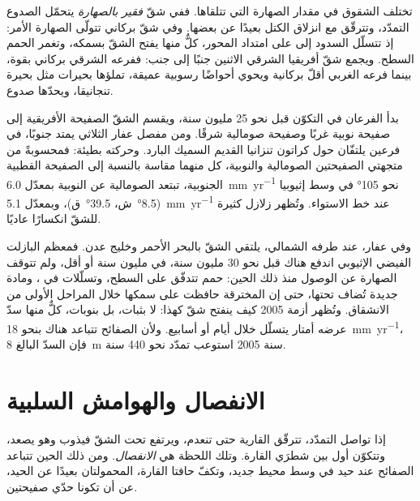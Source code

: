 تختلف الشقوق في مقدار الصهارة التي تتلقاها. ففي شقّ \emph{فقير بالصهارة} يتحمّل الصدوع التمدّد، وتترقّق  مع انزلاق الكتل بعيدًا عن بعضها. وفي شقّ بركاني تتولّى الصهارة الأمر: إذ تتسلّل السدود إلى  على امتداد المحور، كلٌّ منها يفتح الشقّ بسمكه، وتغمر الحمم السطح. ويجمع شقّ أفريقيا الشرقي الاثنين جنبًا إلى جنب: ففرعه الشرقي بركاني بقوة، بينما فرعه الغربي أقلّ بركانية ويحوي أحواضًا رسوبية عميقة، تملؤها بحيرات مثل بحيرة تنجانيقا، ويحدّها صدوع.

بدأ الفرعان في التكوّن قبل نحو 25 مليون سنة، ويقسم الشقّ الصفيحة الأفريقية إلى صفيحة نوبية غربًا وصفيحة صومالية شرقًا. ومن مفصل عفار الثلاثي يمتد جنوبًا، في فرعين يلتفّان حول كراتون تنزانيا القديم السميك البارد. وحركته بطيئة: فمحسوبةً من متجهتي الصفيحتين الصومالية والنوبية، كل منهما مقاسة بالنسبة إلى الصفيحة القطبية الجنوبية، تبتعد الصومالية عن النوبية بمعدّل \qty{6.0}{mm.yr^{-1}} نحو \ang{105} في وسط إثيوبيا (\ang{8.5}~ش، \ang{39.5}~ق)، وبمعدّل \qty{5.1}{mm.yr^{-1}} عند خط الاستواء. وتُظهر زلازل كثيرة للشقّ انكسارًا عاديًا.

وفي عفار، عند طرفه الشمالي، يلتقي الشقّ بالبحر الأحمر وخليج عدن. فمعظم البازلت الفيضي الإثيوبي اندفع هناك قبل نحو 30 مليون سنة، في مليون سنة أو أقل، ولم تتوقف الصهارة عن الوصول منذ ذلك الحين: حمم تتدفّق على السطح، وتسلّلات في ، ومادة جديدة تُضاف تحتها، حتى إن  المخترقة حافظت على سمكها خلال المراحل الأولى من الانشقاق. وتُظهر أزمة 2005 كيف ينفتح شقّ كهذا: لا بثبات، بل بنوبات، كلٌّ منها سدّ عرضه أمتار يتسلّل خلال أيام أو أسابيع. ولأن الصفائح تتباعد هناك بنحو \qty{18}{mm.yr^{-1}}، فإن السدّ البالغ \qty{8}{m} سنة 2005 استوعب تمدّد نحو 440 سنة.

\section{الانفصال والهوامش السلبية}

إذا تواصل التمدّد، تترقّق  القارية حتى تنعدم، ويرتفع  تحت الشقّ فيذوب وهو يصعد، وتتكوّن أول  بين شطرَي القارة. وتلك اللحظة هي \emph{الانفصال}. ومن ذلك الحين تتباعد الصفائح عند حيد في وسط محيط جديد، وتكفّ حافتا القارة، المحمولتان بعيدًا عن الحيد، عن أن تكونا حدّي صفيحتين.

